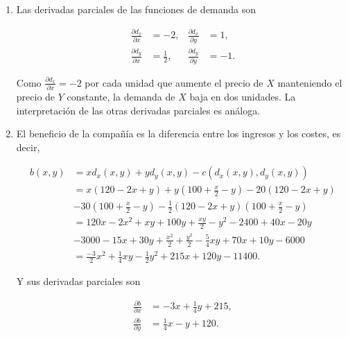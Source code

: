 \documentclass[
  spanish,
  a4paper,
]{scrreport}
\theoremstyle{definition}
\theoremstyle{remark}
\begin{document}
\begin{tcolorbox}[enhanced jigsaw, arc=.35mm, bottomrule=.15mm, bottomtitle=1mm, breakable, colback=white, colbacktitle=quarto-callout-tip-color!10!white, colframe=quarto-callout-tip-color-frame, coltitle=black, left=2mm, leftrule=.75mm, opacityback=0, opacitybacktitle=0.6, rightrule=.15mm, title=\textcolor{quarto-callout-tip-color}{\faLightbulb}\hspace{0.5em}{Solución}, titlerule=0mm, toprule=.15mm, toptitle=1mm]

\begin{enumerate}
\def\labelenumi{\alph{enumi}.}
\item
  Las derivadas parciales de las funciones de demanda son

  \begin{align*}
  \frac{\partial d_x}{\partial x} 
  &= -2, & 
  \frac{\partial d_x}{\partial y} 
  &= 1, \\
  \frac{\partial d_y}{\partial x} 
  &= \frac{1}{2}, 
  & \frac{\partial d_y}{\partial y} 
  &= -1.
  \end{align*}

  Como \(\frac{\partial d_x}{\partial x} = -2\) por cada unidad que
  aumente el precio de \(X\) manteniendo el precio de \(Y\) constante,
  la demanda de \(X\) baja en dos unidades. La interpretación de las
  otras derivadas parciales es análoga.
\item
  El beneficio de la compañía es la diferencia entre los ingresos y los
  costes, es decir,

  \begin{align*}
  b(x,y) 
  &= x d_x(x,y) + y d_y(x,y) - c(d_x(x,y), d_y(x,y))\\
  &= x(120 - 2x + y) + y\left(100 + \frac{x}{2} - y\right) - 20(120 - 2x + y) \\
  &- 30\left(100 + \frac{x}{2} - y\right) - \frac{1}{2}(120 - 2x + y)\left(100 + \frac{x}{2} - y\right) \\
  &=120x - 2x^2 + xy + 100y + \frac{xy}{2} - y^2 - 2400 + 40x - 20y \\
  &- 3000 - 15x + 30y + \frac{x^2}{2} + \frac{y^2}{2} -\frac{5}{4}xy + 70x + 10y - 6000\\
  &= \frac{-3}{2}x^2 + \frac{1}{4}xy - \frac{1}{2}y^2 + 215x + 120y - 11400.
  \end{align*}

  Y sus derivadas parciales son

  \begin{align*}
  \frac{\partial b}{\partial x}
  &= -3x + \frac{1}{4}y + 215, \\
  \frac{\partial b}{\partial y}
  &= \frac{1}{4}x - y + 120.
  \end{align*}


\end{enumerate}
\end{tcolorbox}
\end{document}
